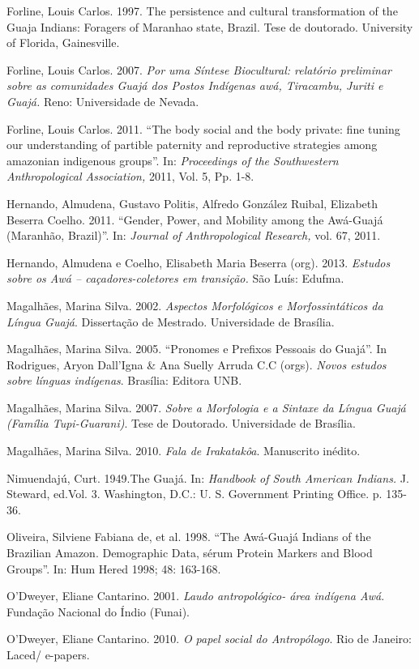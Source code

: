 Forline, Louis Carlos. 1997. The persistence and cultural transformation
of the Guaja Indians: Foragers of Maranhao state, Brazil. Tese de
doutorado. University of Florida, Gainesville.

Forline, Louis Carlos. 2007. \emph{Por uma Síntese Biocultural:
relatório preliminar sobre as comunidades Guajá dos Postos Indígenas
awá, Tiracambu, Juriti e Guajá.} Reno: Universidade de Nevada.

Forline, Louis Carlos. 2011. ``The body social and the body private: fine
tuning our understanding of partible paternity and reproductive
strategies among amazonian indigenous groups''. In: \emph{Proceedings of
the Southwestern Anthropological Association,} 2011, Vol. 5, Pp. 1-8.

Hernando, Almudena, Gustavo Politis, Alfredo González Ruibal, Elizabeth
Beserra Coelho. 2011. ``Gender, Power, and Mobility among the Awá-Guajá
(Maranhão, Brazil)''. In: \emph{Journal of Anthropological Research,}
vol. 67, 2011.

Hernando, Almudena e Coelho, Elisabeth Maria Beserra (org). 2013.
\emph{Estudos sobre os Awá -- caçadores-coletores em transição.} São
Luís: Edufma.

Magalhães, Marina Silva. 2002. \emph{Aspectos Morfológicos e
Morfossintáticos da Língua Guajá}. Dissertação de Mestrado. Universidade
de Brasília.

Magalhães, Marina Silva. 2005. ``Pronomes e Prefixos Pessoais do
Guajá''. In Rodrigues, Aryon Dall'Igna \& Ana Suelly Arruda C.C (orgs).
\emph{Novos estudos sobre línguas indígenas}. Brasília: Editora UNB.

Magalhães, Marina Silva. 2007. \emph{Sobre a Morfologia e a Sintaxe da
Língua Guajá (Família Tupi-Guarani)}. Tese de Doutorado. Universidade de
Brasília.

Magalhães, Marina Silva. 2010. \emph{Fala de Irakatakôa}. Manuscrito
inédito.

Nimuendajú, Curt. 1949.The Guajá. In: \emph{Handbook of South American
Indians.} J. Steward, ed.Vol. 3. Washington, D.C.: U. S. Government
Printing Office. p. 135-36.

Oliveira, Silviene Fabiana de, et al. 1998. ``The Awá-Guajá Indians of
the Brazilian Amazon. Demographic Data, sérum Protein Markers and Blood
Groups''. In: Hum Hered 1998; 48: 163-168.

O'Dweyer, Eliane Cantarino. 2001. \emph{Laudo antropológico- área
indígena Awá}. Fundação Nacional do Índio (Funai).

O'Dweyer, Eliane Cantarino. 2010. \emph{O papel social do Antropólogo}.
Rio de Janeiro: Laced/ e-papers.

